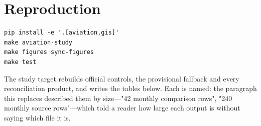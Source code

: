 \section{Reproduction}
\label{app:repro}

\begin{verbatim}
pip install -e '.[aviation,gis]'
make aviation-study
make figures sync-figures
make test
\end{verbatim}

The study target rebuilds official controls, the provisional fallback and every reconciliation
product, and writes the tables below. Each is named: the paragraph this replaces described them
by size---"\num{42} monthly comparison rows", "\num{240} monthly source rows"---which told a
reader how large each output is without saying which file it is.

